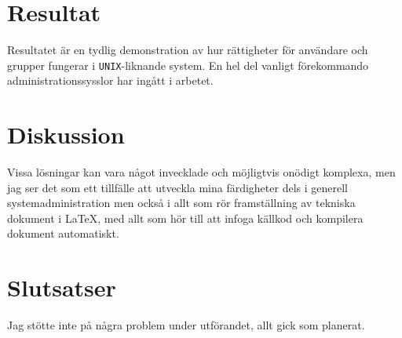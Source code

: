 %
%
%


\section{Resultat}
Resultatet är en tydlig demonstration av hur rättigheter för användare och
grupper fungerar i \texttt{UNIX}-liknande system. En hel del vanligt förekommando
administrationssysslor har ingått i arbetet.

\section{Diskussion}
Vissa lösningar kan vara något invecklade och möjligtvis onödigt komplexa,
men jag ser det som ett tillfälle att utveckla mina färdigheter dels i generell
systemadministration men också i allt som rör framställning av tekniska dokument
i \LaTeX , med allt som hör till att infoga källkod och kompilera dokument
automatiskt.


\section{Slutsatser}
Jag stötte inte på några problem under utförandet, allt gick som planerat.
